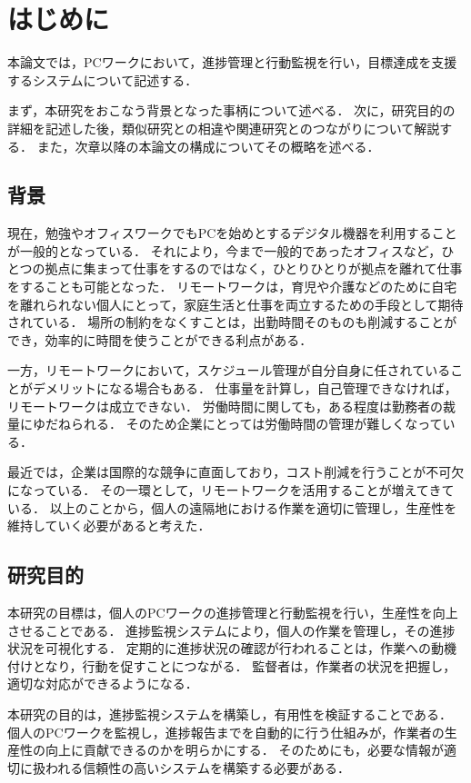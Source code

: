 \chapter{はじめに}
本論文では，PCワークにおいて，進捗管理と行動監視を行い，目標達成を支援するシステムについて記述する．

まず，本研究をおこなう背景となった事柄について述べる．
次に，研究目的の詳細を記述した後，類似研究との相違や関連研究とのつながりについて解説する．
また，次章以降の本論文の構成についてその概略を述べる．

\section{背景}
現在，勉強やオフィスワークでもPCを始めとするデジタル機器を利用することが一般的となっている．
それにより，今まで一般的であったオフィスなど，ひとつの拠点に集まって仕事をするのではなく，ひとりひとりが拠点を離れて仕事をすることも可能となった．
リモートワークは，育児や介護などのために自宅を離れられない個人にとって，家庭生活と仕事を両立するための手段として期待されている．
場所の制約をなくすことは，出勤時間そのものも削減することができ，効率的に時間を使うことができる利点がある．

一方，リモートワークにおいて，スケジュール管理が自分自身に任されていることがデメリットになる場合もある．
仕事量を計算し，自己管理できなければ，リモートワークは成立できない．
労働時間に関しても，ある程度は勤務者の裁量にゆだねられる．
そのため企業にとっては労働時間の管理が難しくなっている\cite{Adachi2010}．

最近では，企業は国際的な競争に直面しており，コスト削減を行うことが不可欠になっている．
その一環として，リモートワークを活用することが増えてきている\cite{Telework2010}．
以上のことから，個人の遠隔地における作業を適切に管理し，生産性を維持していく必要があると考えた．

\section{研究目的}
本研究の目標は，個人のPCワークの進捗管理と行動監視を行い，生産性を向上させることである．
進捗監視システムにより，個人の作業を管理し，その進捗状況を可視化する．
定期的に進捗状況の確認が行われることは，作業への動機付けとなり，行動を促すことにつながる．
監督者は，作業者の状況を把握し，適切な対応ができるようになる．

本研究の目的は，進捗監視システムを構築し，有用性を検証することである．
個人のPCワークを監視し，進捗報告までを自動的に行う仕組みが，作業者の生産性の向上に貢献できるのかを明らかにする．
そのためにも，必要な情報が適切に扱われる信頼性の高いシステムを構築する必要がある．

